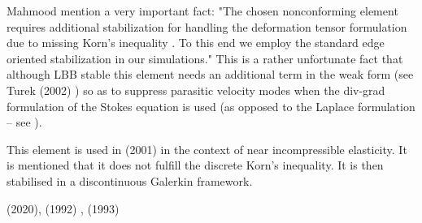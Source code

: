 Mahmood \etal \cite{maky17} mention a very important fact: "The chosen nonconforming element requires
additional stabilization for handling the deformation tensor formulation due to missing Korn's inequality 
\cite{horg95,knob00,bren04}.
To this end we employ the standard edge oriented stabilization \cite{tuos02,tuou07} in our simulations."
This is a rather unfortunate fact that although LBB stable this element needs an additional 
term in the weak form (see Turek \etal (2002) \cite{tuos02}) 
so as to suppress parasitic velocity modes when the div-grad formulation 
of the Stokes equation is used (as opposed to the Laplace formulation -- see \cite[Section 6.5.2]{dohu03}).

This element is used in \textcite{hala01} (2001) in the context of near incompressible elasticity. 
It is mentioned that it does not fulfill the discrete Korn's inequality. It is then stabilised 
in a discontinuous Galerkin framework.

\Literature \textcite{shee20} (2020), \textcite{chen92} (1992) , \textcite{chen93} (1993) 






